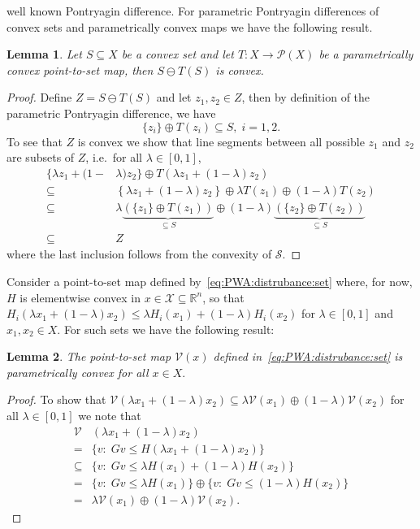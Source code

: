 \documentclass[letterpaper, 10pt, conference]{ieeeconf} %
\newtheorem{thm}{Lemma}[section]
\begin{document}
    well known Pontryagin difference.
    For parametric Pontryagin differences of convex sets and parametrically convex maps we have the following result.
%
    \begin{thm}\label{thm:convexity:of:pontryagin:difference}
      Let $S\subseteq X$ be a convex set and let $T:X\rightarrow\mathcal P(X)$ be a parametrically convex point-to-set
      map, then $S\ominus T(S)$ is convex. 
    \end{thm}
%
    \begin{proof}
      Define $ Z =  S\ominus T( S)$ and let $z_1,z_2\in Z$, then
      by definition of the parametric Pontryagin difference, we have
      \begin{equation}
        \{z_i\} \oplus T(z_i) \subseteq S,\; i=1,2.
      \end{equation}
      To see that $ Z$ is convex we show that line segments between
      all possible $z_1$ and $z_2$ are subsets of $ Z$, i.e.~for all $\lambda \in [0,1]$,
      \[\begin{aligned}
        \{ \lambda z_1 + (1-&\lambda)z_2
        \}\oplus T\left( \lambda z_1 + (1-\lambda)z_2\right)\\
        \subseteq&\left\{ \lambda z_1 + (1-\lambda)z_2
        \right\}\oplus \lambda T(z_1) \oplus (1-\lambda)
         T(z_2)\\
        \subseteq &\lambda\underbrace{(\{z_1\}\oplus T(z_1))}_{\subseteq S}\oplus
        (1-\lambda)\underbrace{(\{z_2\}\oplus T(z_2))}_{\subseteq S}\\
        \subseteq& Z
        \end{aligned}\]
      where the last inclusion follows from the convexity of $\mathcal S$.
    \end{proof}
%
%
  Consider a point-to-set map defined by~\eqref{eq:PWA:distrubance:set}
    where, for now, $H$ is elementwise convex in $x\in \mathscr X\subseteq\mathbb R^n$, so that 
    $H_i(\lambda x_1+(1-\lambda)x_2)\leq \lambda H_i(x_1)+(1-\lambda)H_i(x_2)$ for 
    $\lambda\in[0,1]$ and $x_1, x_2\in X$.  For such sets we have the following result:
    \begin{thm}\label{thm:convex:parametric:set}
      The point-to-set map $\mathcal V (x)$ defined in~\eqref{eq:PWA:distrubance:set} is parametrically 
      convex for all $x\in X.$
    \end{thm}
%
    \begin{proof}
      To show that $\mathcal V(\lambda x_1 + (1-\lambda)x_2)\subseteq 
      \lambda\mathcal V(x_1) \oplus(1-\lambda)\mathcal V(x_2)$ for all $\lambda \in [0,1]$ we note that
        \begin{align*}
        \mathcal V&(\lambda x_1 + (1-\lambda)x_2)\\
        =& \{v:\; G v \leq H(\lambda x_1 + (1-\lambda)x_2)\}\\
        \subseteq& \{v:\;Gv\leq\lambda H(x_1)+(1-\lambda) H(x_2)\}\\
        =&\{v:\;Gv\leq\lambda H(x_1)\}\oplus\{v
        :\;Gv\leq(1-\lambda)H(x_2)\}\\
        =&\lambda\mathcal V(x_1)\oplus(1-\lambda)\mathcal V(x_2).
        \end{align*}
\baselineskip
    \end{proof} 
\end{document}
